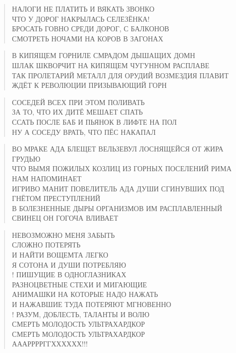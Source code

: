 \poemtitle{***}
\begin{verse}
НАЛОГИ НЕ ПЛАТИТЬ И ВЯКАТЬ ЗВОНКО\\
ЧТО У ДОРОГ НАКРЫЛАСЬ СЕЛЕЗЁНКА!\\
БРОСАТЬ ГОВНО СРЕДИ ДОРОГ, С БАЛКОНОВ\\
СМОТРЕТЬ НОЧАМИ НА КОРОВ В ЗАГОНАХ
\end{verse}

\poemtitle{***}
\begin{verse}
В КИПЯЩЕМ ГОРНИЛЕ СМРАДОМ ДЫШАЩИХ ДОМН\\
ШЛАК ШКВОРЧИТ НА КИПЯЩЕМ ЧУГУННОМ РАСПЛАВЕ\\
ТАК ПРОЛЕТАРИЙ МЕТАЛЛ ДЛЯ ОРУДИЙ ВОЗМЕЗДИЯ ПЛАВИТ\\
ЖДЁТ К РЕВОЛЮЦИИ ПРИЗЫВАЮЩИЙ ГОРН
\end{verse}

\poemtitle{***}
\begin{verse}
СОСЕДЕЙ ВСЕХ ПРИ ЭТОМ ПОЛИВАТЬ\\
ЗА ТО, ЧТО ИХ ДИТЁ МЕШАЕТ СПАТЬ\\
ССАТЬ ПОСЛЕ БАБ И ПЬЯНОК В ЛИФТЕ НА ПОЛ\\
НУ А СОСЕДУ ВРАТЬ, ЧТО ПЁС НАКАПАЛ
\end{verse}

\poemtitle{***}
\begin{verse}
ВО МРАКЕ АДА БЛЕЩЕТ ВЕЛЬЗЕВУЛ ЛОСНЯЩЕЙСЯ ОТ ЖИРА ГРУДЬЮ\\
ЧТО ВЫМЯ ПОЖИЛЫХ КОЗЛИЦ ИЗ ГОРНЫХ ПОСЕЛЕНИЙ РИМА НАМ НАПОМИНАЕТ\\
ИГРИВО МАНИТ ПОВЕЛИТЕЛЬ АДА ДУШИ СГИНУВШИХ ПОД ГНЁТОМ ПРЕСТУПЛЕНИЙ\\
В БОЛЕЗНЕННЫЕ ДЫРЫ ОРГАНИЗМОВ ИМ РАСПЛАВЛЕННЫЙ СВИНЕЦ ОН ГОГОЧА ВЛИВАЕТ
\end{verse}

\poemtitle{***}
\begin{verse}
НЕВОЗМОЖНО МЕНЯ ЗАБЫТЬ\\
СЛОЖНО ПОТЕРЯТЬ\\
И НАЙТИ ВОЩЕМТА ЛЕГКО\\
Я СОТОНА И ДУШИ ПОТРЕБЛЯЮ\\!
ПИШУЩИЕ В ОДНОГЛАЗНИКАХ\\
РАЗНОЦВЕТНЫЕ СТЕХИ И МИГАЮЩИЕ\\
АНИМАШКИ НА КОТОРЫЕ НАДО НАЖАТЬ\\
И НАЖАВШИЕ ТУДА ПОТЕРЯЮТ МГНОВЕННО\\!
РАЗУМ, ДОБЛЕСТЬ, ТАЛАНТЫ И ВОЛЮ\\
СМЕРТЬ МОЛОДОСТЬ УЛЬТРАХАРДКОР\\
СМЕРТЬ МОЛОДОСТЬ УЛЬТРАХАРДКОР\\
АААРРРРГГХХХХХХ!!!
\end{verse}

